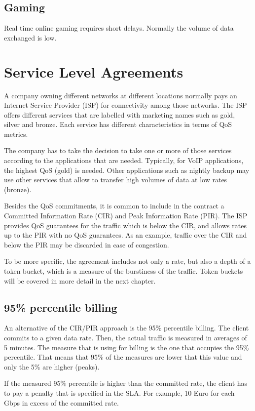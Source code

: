 \subsection{Gaming}
Real time online gaming requires short delays.
Normally the volume of data exchanged is low.

\section{Service Level Agreements}

A company owning different networks at different locations normally pays an Internet Service Provider (ISP) for connectivity among those networks.
The ISP offers different services that are labelled with marketing names such as gold, silver and bronze.
Each service has different characteristics in terms of QoS metrics.

The company has to take the decision to take one or more of those services according to the applications that are needed.
Typically, for VoIP applications, the highest QoS (gold) is needed.
Other applications such as nightly backup may use other services that allow to transfer high volumes of data at low rates (bronze).

Besides the QoS commitments, it is common to include in the contract a Committed Information Rate (CIR) and Peak Information Rate (PIR).
The ISP provides QoS guarantees for the traffic which is below the CIR, and allows rates up to the PIR with no QoS guarantees.
As an example, traffic over the CIR and below the PIR may be discarded in case of congestion.

To be more specific, the agreement includes not only a rate, but also a depth of a token bucket, which is a measure of the burstiness of the traffic. 
Token buckets will be covered in more detail in the next chapter.

\subsection{95\% percentile billing}

An alternative of the CIR/PIR approach is the 95\% percentile billing.
The client commits to a given data rate.
Then, the actual traffic is measured in averages of 5 minutes.
The measure that is using for billing is the one that occupies the 95\% percentile.
That means that 95\% of the measures are lower that this value and only the 5\% are higher (peaks).

If the measured 95\% percentile is higher than the committed rate, the client has to pay a penalty that is specified in the SLA.
For example, 10 Euro for each Gbps in excess of the committed rate.
